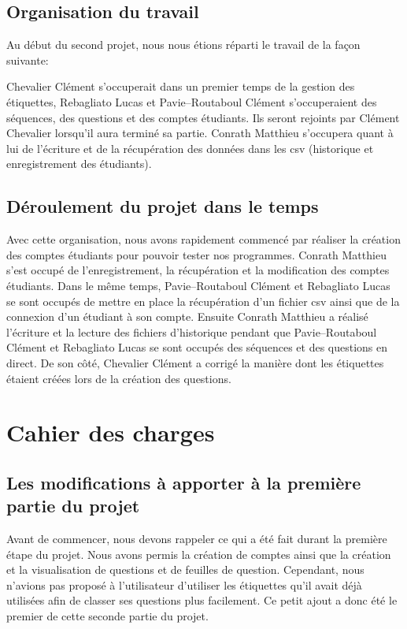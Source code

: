 \documentclass[a4paper, 12pt]{article}
\begin{document}
\subsection{Organisation du travail}

Au début du second projet, nous nous étions réparti le travail de la façon suivante: 

\newline
Chevalier Clément s'occuperait dans un premier temps de la gestion des étiquettes, Rebagliato Lucas et Pavie--Routaboul Clément s'occuperaient des séquences, des questions et des comptes étudiants.
Ils seront rejoints par Clément Chevalier lorsqu'il aura terminé sa partie. 
Conrath Matthieu s'occupera quant à lui de l'écriture et de la récupération des données dans les csv (historique et enregistrement des étudiants).

\subsection{Déroulement du projet dans le temps}

Avec cette organisation, nous avons rapidement commencé par réaliser la création des comptes étudiants pour pouvoir tester nos programmes.
Conrath Matthieu s'est occupé de l'enregistrement, la récupération et la modification des comptes étudiants.
Dans le même temps, Pavie--Routaboul Clément et Rebagliato Lucas se sont occupés de mettre en place la récupération d'un fichier csv ainsi que de la connexion d'un étudiant à son compte. 
Ensuite Conrath Matthieu a réalisé l'écriture et la lecture des fichiers d'historique pendant que Pavie--Routaboul Clément et Rebagliato Lucas se sont occupés des séquences et des questions en direct. 
De son côté, Chevalier Clément a corrigé la manière dont les étiquettes étaient créées lors de la création des questions.   

\section{Cahier des charges}
\subsection{Les modifications à apporter à la première partie du projet}

Avant de commencer, nous devons rappeler ce qui a été fait durant la première étape du projet. 
Nous avons permis la création de comptes ainsi que la création et la visualisation de questions et de feuilles de question. Cependant, nous n’avions pas proposé à l'utilisateur d'utiliser les étiquettes qu'il avait déjà utilisées afin de classer ses questions plus facilement. Ce petit ajout a donc été le premier de cette seconde partie du projet.
\end{document}

